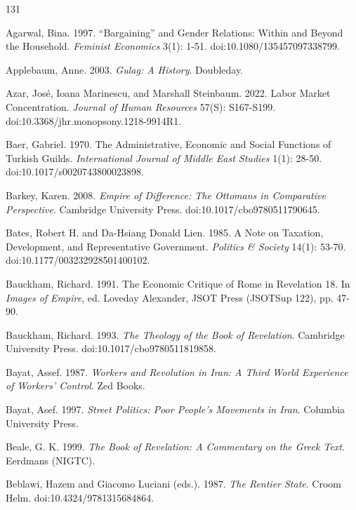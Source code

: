 \documentclass[11pt,letterpaper]{article}
\theoremstyle{definition}
\theoremstyle{remark}
\begin{document}
\begin{thebibliography}{131}
\small
\raggedright
\setlength{\itemsep}{2pt}
Agarwal, Bina. 1997. ``Bargaining'' and Gender Relations: Within and Beyond the Household. \emph{Feminist Economics} 3(1): 1-51. doi:10.1080/135457097338799.

Applebaum, Anne. 2003. \emph{Gulag: A History}. Doubleday.

Azar, Jos\'e, Ioana Marinescu, and Marshall Steinbaum. 2022. Labor Market Concentration. \emph{Journal of Human Resources} 57(S): S167-S199. doi:10.3368/jhr.monopsony.1218-9914R1.

Baer, Gabriel. 1970. The Administrative, Economic and Social Functions of Turkish Guilds. \emph{International Journal of Middle East Studies} 1(1): 28-50. doi:10.1017/s0020743800023898.

Barkey, Karen. 2008. \emph{Empire of Difference: The Ottomans in Comparative Perspective}. Cambridge University Press. doi:10.1017/cbo9780511790645.

Bates, Robert H. and Da-Hsiang Donald Lien. 1985. A Note on Taxation, Development, and Representative Government. \emph{Politics \& Society} 14(1): 53-70. doi:10.1177/003232928501400102.

Bauckham, Richard. 1991. The Economic Critique of Rome in Revelation 18. In \emph{Images of Empire}, ed. Loveday Alexander, JSOT Press (JSOTSup 122), pp. 47-90.

Bauckham, Richard. 1993. \emph{The Theology of the Book of Revelation}. Cambridge University Press. doi:10.1017/cbo9780511819858.

Bayat, Assef. 1987. \emph{Workers and Revolution in Iran: A Third World Experience of Workers' Control}. Zed Books.

Bayat, Asef. 1997. \emph{Street Politics: Poor People's Movements in Iran}. Columbia University Press.

Beale, G. K. 1999. \emph{The Book of Revelation: A Commentary on the Greek Text}. Eerdmans (NIGTC).

Beblawi, Hazem and Giacomo Luciani (eds.). 1987. \emph{The Rentier State}. Croom Helm. doi:10.4324/9781315684864.


\end{thebibliography}
\end{document}
